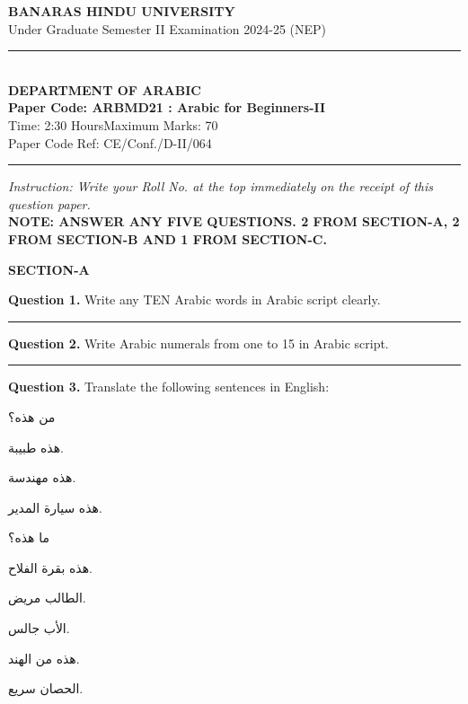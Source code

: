 \documentclass[11pt,a4paper]{article}
\begin{document}
\begin{center}
  {\large\bfseries BANARAS HINDU UNIVERSITY}\\[2pt]
  {\normalsize Under Graduate Semester II Examination 2024-25 (NEP)}\\[6pt]
  \rule{0.8\linewidth}{0.5pt}\\[6pt]
  {\large\bfseries DEPARTMENT OF ARABIC}\\[4pt]
  {\large\bfseries Paper Code: ARBMD21 : Arabic for Beginners-II}\\[4pt]
  {\normalsize Time: 2:30 Hours\hfill Maximum Marks: 70}\\[2pt]
  {\small Paper Code Ref: CE/Conf./D-II/064}
\end{center}

\rule{\linewidth}{0.4pt}

\smallskip



\noindent   \textit{Instruction: Write your Roll No. at the top immediately on the receipt of this question paper.}\\[2pt]



\noindent   \textbf{NOTE: ANSWER ANY FIVE QUESTIONS. 2 FROM SECTION-A, 2 FROM SECTION-B AND 1 FROM SECTION-C.}

\bigskip


\begin{center}
  {\bfseries\large SECTION-A}
\end{center}




\noindent   \textbf{Question 1.} Write any TEN Arabic words in Arabic script clearly.

\medskip\rule{\linewidth}{0.2pt}\medskip




\noindent   \textbf{Question 2.} Write Arabic numerals from one to 15 in Arabic script.

\medskip\rule{\linewidth}{0.2pt}\medskip




\noindent   \textbf{Question 3.} Translate the following sentences in English:

\begin{parts}
  \item من هذه؟
  \item هذه طبيبة.
  \item هذه مهندسة.
  \item هذه سيارة المدير.
  \item ما هذه؟
  \item هذه بقرة الفلاح.
  \item الطالب مريض.
  \item الأب جالس.
  \item هذه من الهند.
  \item الحصان سريع.
\end{parts}
\end{document}
